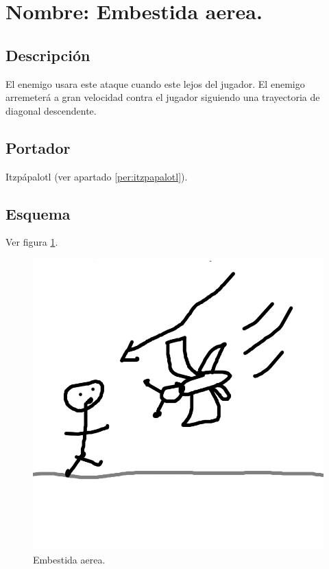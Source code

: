\section{Nombre: Embestida aerea.}\label{hab.EmbesAer}
\subsection{Descripción}
El enemigo usara este ataque cuando este lejos del jugador. El enemigo arremeterá a gran velocidad contra el jugador siguiendo una trayectoria de diagonal descendente.
\subsection{Portador}
Itzpápalotl (ver apartado \ref{per:itzpapalotl}).
\subsection{Esquema}
			Ver figura \ref{fig:embestidaA}.
			\begin{figure}
				\centering
				\includegraphics[height=0.2 \textheight]{Imagenes/embestidaA}
				\caption{Embestida aerea.}
				\label{fig:embestidaA}
			\end{figure}
